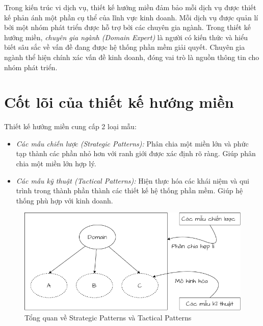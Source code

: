 Trong kiến trúc vi dịch vụ, thiết kế hướng miền đảm bảo mỗi dịch vụ được thiết kế phản ánh một phần cụ thể của lĩnh vực kinh doanh. Mỗi dịch vụ được quản lí bởi một nhóm phát triển được hỗ trợ bởi các chuyên gia ngành. Trong thiết kế hướng miền, \emph{chuyên gia ngành (Domain Expert)} là người có kiến thức và hiểu biết sâu sắc về vấn đề đang được hệ thống phần mềm giải quyết. Chuyên gia ngành thể hiện chính xác vấn đề kinh doanh, đóng vai trò là nguồn thông tin cho nhóm phát triển.

\section{Cốt lõi của thiết kế hướng miền}


Thiết kế hướng miền cung cấp 2 loại mẫu:

\begin{itemize}

\item \emph{Các mẫu chiến lược (Strategic Patterns):} Phân chia một miền lớn và phức tạp thành các phần nhỏ hơn với ranh giới được xác định rõ ràng. Giúp phân chia một miền lớn hợp lý.

\item \emph{Các mẫu kỹ thuật (Tactical Patterns):} Hiện thực hóa các khái niệm và qui trình trong thành phần thành các thiết kế hệ thống phần mềm. Giúp hệ thống phù hợp với kinh doanh.

\end{itemize}

\begin{figure}[H]

\centering

\includegraphics[scale = 0.5]{pictures/cac_mau_chien_luoc_va_cac_mau_ky_thuat/main.drawio.png}

\caption{Tổng quan về Strategic Patterns và Tactical Patterns}

\end{figure}

